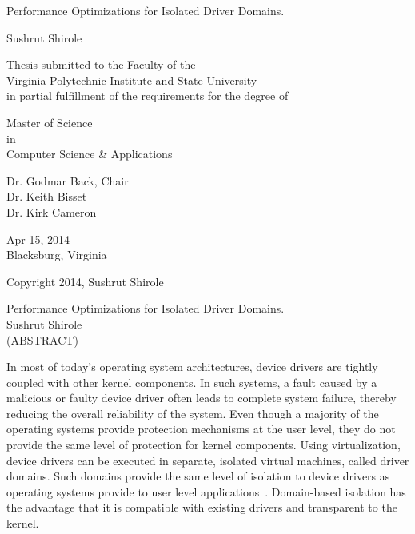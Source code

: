 \documentclass[12pt]{report}
\begin{document}
\thispagestyle{empty}
\begin{center}

{\Large 
Performance Optimizations for Isolated Driver Domains.
}

\vfill

Sushrut Shirole

\vfill

Thesis submitted to the Faculty of the \\
Virginia Polytechnic Institute and State University \\
in partial fulfillment of the requirements for the degree of

\vfill

Master of Science \\
in \\
Computer Science \& Applications

\vfill

Dr. Godmar Back, Chair \\
Dr. Keith Bisset \\
Dr. Kirk Cameron\\


\vfill

Apr 15, 2014 \\
Blacksburg, Virginia

\vfill

Copyright 2014, Sushrut Shirole

\end{center}

\pagebreak

\thispagestyle{empty}
\begin{center}

{\large 
Performance Optimizations for Isolated Driver Domains.
}
\\[8mm]
Sushrut Shirole
\\[8mm]
(ABSTRACT)
\\[10mm]
\end{center}
In most of today's operating system architectures, device drivers are
tightly coupled with other kernel components. In such systems, a fault
caused by a malicious or faulty device driver often leads to complete 
system failure, thereby reducing
the overall reliability of the system. Even though a majority of the operating
systems provide protection mechanisms at the user level, they do not
provide the same level of protection for kernel components.  
Using virtualization, device drivers can be executed in separate,
isolated virtual machines, called driver domains.  Such domains
provide the same level of isolation to device drivers as operating
systems provide to user level applications~\cite{Fraser04safehardware}.
Domain-based isolation has the advantage that it is compatible
with existing drivers and transparent to the kernel.
\end{document}
